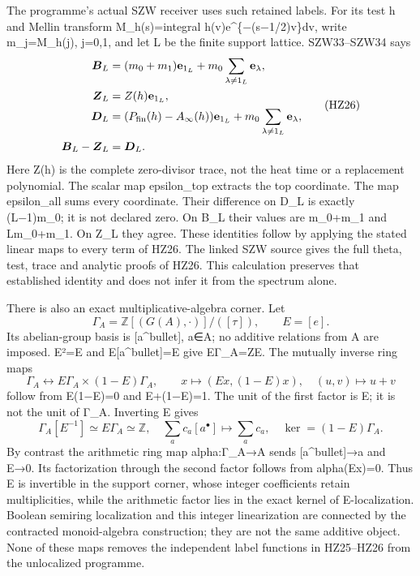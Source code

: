\documentclass[
]{article}
\begin{document}
The programme's actual SZW receiver uses such retained labels. For its
test h and Mellin transform M\_h(s)=integral h(v)e\^{}\{−(s−1/2)v\}dv,
write m\_j=M\_h(j), j=0,1, and let L be the finite support lattice.
SZW33--SZW34 says \[
\begin{aligned}
\boldsymbol B_L&=(m_0+m_1)\mathbf e_{1_L}
+m_0\sum_{\lambda\ne1_L}\mathbf e_\lambda,\\
\boldsymbol Z_L&=Z(h)\mathbf e_{1_L},\\
\boldsymbol D_L&=(P_{\rm fin}(h)-A_\infty(h))\mathbf e_{1_L}
+m_0\sum_{\lambda\ne1_L}\mathbf e_\lambda,\\
\boldsymbol B_L-\boldsymbol Z_L&=\boldsymbol D_L.
\end{aligned}
\tag{HZ26}
\] Here Z(h) is the complete zero-divisor trace, not the heat time or a
replacement polynomial. The scalar map epsilon\_top extracts the top
coordinate. The map epsilon\_all sums every coordinate. Their difference
on D\_L is exactly (\textbar L\textbar−1)m\_0; it is not declared zero.
On B\_L their values are m\_0+m\_1 and \textbar L\textbar m\_0+m\_1. On
Z\_L they agree. These identities follow by applying the stated linear
maps to every term of HZ26. The linked SZW source gives the full theta,
test, trace and analytic proofs of HZ26. This calculation preserves that
established identity and does not infer it from the spectrum alone.

There is also an exact multiplicative-algebra corner. Let \[
\Gamma_A=\mathbb Z[(G(A),\cdot)]/([\tau]),\qquad E=[e].
\tag{HZ27}
\] Its abelian-group basis is {[}a\^{}bullet{]}, a∈A; no additive
relations from A are imposed. E²=E and E{[}a\^{}bullet{]}=E give
EΓ\_A=ZE. The mutually inverse ring maps \[
\Gamma_A\longleftrightarrow E\Gamma_A\times(1-E)\Gamma_A,
\qquad x\mapsto(Ex,(1-E)x),\quad(u,v)\mapsto u+v
\tag{HZ28}
\] follow from E(1−E)=0 and E+(1−E)=1. The unit of the first factor is
E; it is not the unit of Γ\_A. Inverting E gives \[
\Gamma_A[E^{-1}]\simeq E\Gamma_A\simeq\mathbb Z,
\quad \sum_a c_a[a^\bullet]\mapsto\sum_a c_a,
\quad\ker=(1-E)\Gamma_A.
\tag{HZ29}
\] By contrast the arithmetic ring map alpha:Γ\_A→A sends
{[}a\^{}bullet{]}→a and E→0. Its factorization through the second factor
follows from alpha(Ex)=0. Thus E is invertible in the support corner,
whose integer coefficients retain multiplicities, while the arithmetic
factor lies in the exact kernel of E-localization. Boolean semiring
localization and this integer linearization are connected by the
contracted monoid-algebra construction; they are not the same additive
object. None of these maps removes the independent label functions in
HZ25--HZ26 from the unlocalized programme.
\end{document}
